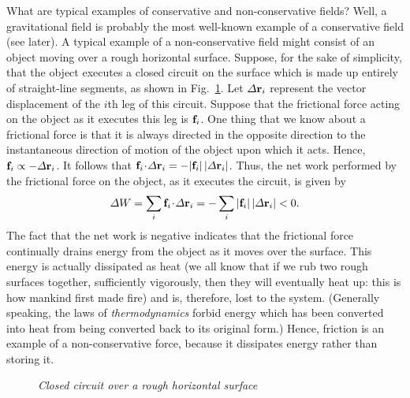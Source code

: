 What are typical examples of conservative and non-conservative fields? Well, a gravitational
field is probably the most well-known example of a conservative field (see later).
A typical example of a non-conservative field might consist of an
object moving over a rough horizontal surface. Suppose, for the sake of simplicity,
that the object executes a closed circuit on the surface which is made
up entirely of straight-line segments, as shown in Fig.~\ref{f41}.
Let ${\mit\Delta}{\bf r}_i$ represent the vector displacement of the $i$th leg
of this circuit. Suppose that the frictional force acting on the object as it executes this
leg is ${\bf f}_i$. One thing that we know about a frictional force
is that it is always directed in  the opposite direction to the instantaneous
direction of motion of the object upon which it acts. Hence, ${\bf f}_i\propto
-{\mit\Delta}{\bf r}_i$. It follows that ${\bf f}_i\!\cdot \! {\mit\Delta}{\bf r}_i
= - |{\bf f}_i|\,|{\mit\Delta}{\bf r}_i|$. Thus, the net work
performed by the frictional force on the object, as it executes the circuit, is
given by
\begin{equation}
{\mit\Delta}W = \sum_i {\bf f}_i\!\cdot\!{\mit\Delta}{\bf r}_i = 
-\sum_i |{\bf f}_i| \,|{\mit\Delta}{\bf r}_i| < 0.
\end{equation}
The fact that the net work is negative indicates that the frictional force continually
drains energy from the object as it moves over the surface. This energy
is actually dissipated as heat (we all know that if we rub two rough surfaces
together, sufficiently vigorously, then they will eventually heat up: this is
how mankind first made fire) and is, therefore, lost to the
system. (Generally speaking, the laws of {\em thermodynamics} forbid energy which has been
converted into heat from being converted back to its original form.)
Hence, friction is an example of a non-conservative force, because it dissipates
energy rather than storing it.

\begin{figure}
\epsfysize=2.5in
\centerline{}
\caption{\em Closed circuit over a rough horizontal surface}\label{f41}   
\end{figure}

